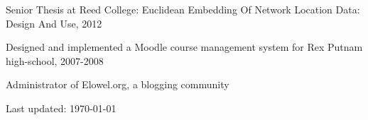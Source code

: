 \documentclass[letterpaper]{article}
\def\footerlink{} %
\renewenvironment{itemize}{\begin{list}{}{\setlength{\leftmargin}{1.5em}}}{\end{list}}%
\begin{document}
\begin{itemize}
\item Senior Thesis at Reed College: Euclidean Embedding Of Network Location Data: Design And Use, 2012
\item Designed and implemented a Moodle course management system for Rex Putnam high-school, 2007-2008
\item Administrator of Elowel.org, a blogging community
\end{itemize}

%


\bigskip

\begin{center}
  \begin{footnotesize}
    Last updated: \today \\
    \href{\footerlink}{\texttt{\footerlink}}
  \end{footnotesize}
\end{center}
\end{document}
